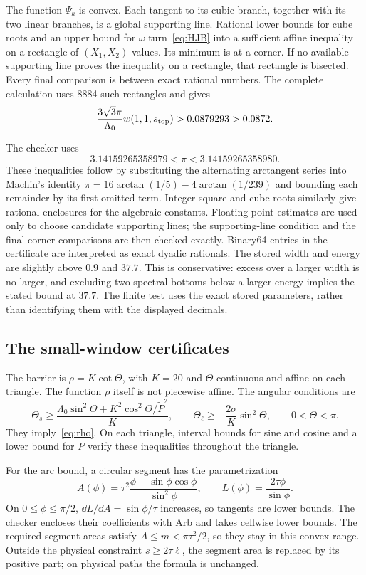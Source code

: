The function $\Psi_k$ is convex. Each tangent to its cubic branch, together with its two linear branches, is a global supporting line. Rational lower bounds for cube roots and an upper bound for $\omega$ turn~\eqref{eq:HJB} into a sufficient affine inequality on a rectangle of $(X_1,X_2)$ values. Its minimum is at a corner. If no available supporting line proves the inequality on a rectangle, that rectangle is bisected. Every final comparison is between exact rational numbers. The complete calculation uses 8884 such rectangles and gives
\[
 \frac{3\sqrt3\pi}{\Lambda_0}w(1,1,s_{\rm top})>0.0879293>0.0872.
\]

The checker uses
\[
 3.14159265358979<\pi<3.14159265358980.
\]
These inequalities follow by substituting the alternating arctangent series into Machin's identity $\pi=16\arctan(1/5)-4\arctan(1/239)$ and bounding each remainder by its first omitted term. Integer square and cube roots similarly give rational enclosures for the algebraic constants. Floating-point estimates are used only to choose candidate supporting lines; the supporting-line condition and the final corner comparisons are then checked exactly.
Binary64 entries in the certificate are interpreted as exact dyadic rationals. The stored width and energy are slightly above $0.9$ and $37.7$. This is conservative: excess over a larger width is no larger, and excluding two spectral bottoms below a larger energy implies the stated bound at $37.7$. The finite test uses the exact stored parameters, rather than identifying them with the displayed decimals.

\subsection{The small-window certificates}
The barrier is $\rho=K\cot\Theta$, with $K=20$ and \emph{$\Theta$} continuous and affine on each triangle. The function $\rho$ itself is not piecewise affine. The angular conditions are
\[
 \Theta_s\ge\frac{\Lambda_0\sin^2\Theta+K^2\cos^2\Theta/\widetilde P^2}{K},
 \qquad
 \Theta_\ell\ge-\frac{2\sigma}{K}\sin^2\Theta,
 \qquad 0<\Theta<\pi.
\]
They imply~\eqref{eq:rho}. On each triangle, interval bounds for sine and cosine and a lower bound for $\widetilde P$ verify these inequalities throughout the triangle.

For the arc bound, a circular segment has the parametrization
\[
 A(\phi)=\tau^2\frac{\phi-\sin\phi\cos\phi}{\sin^2\phi},
 \qquad L(\phi)=\frac{2\tau\phi}{\sin\phi}.
\]
On $0\le\phi\le\pi/2$, $\dd L/\dd A=\sin\phi/\tau$ increases, so tangents are lower bounds. The checker encloses their coefficients with Arb and takes cellwise lower bounds. The required segment areas satisfy $A\le m<\pi\tau^2/2$, so they stay in this convex range. Outside the physical constraint $s\ge2\tau\ell$, the segment area is replaced by its positive part; on physical paths the formula is unchanged.

